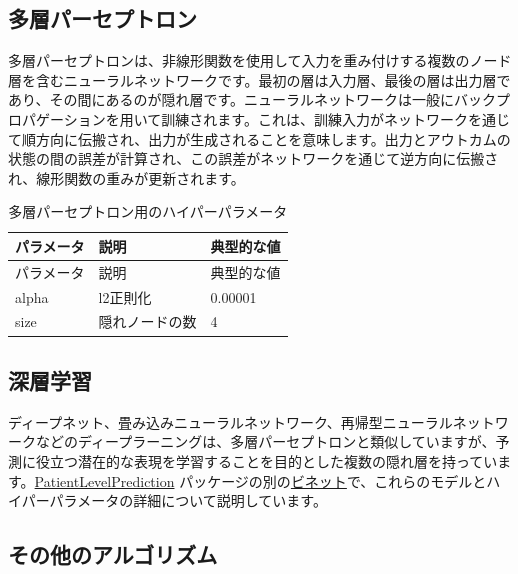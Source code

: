 \documentclass[
  11pt]{book}
\theoremstyle{definition}
\theoremstyle{definition}
\theoremstyle{definition}
\theoremstyle{definition}
\theoremstyle{remark}
\begin{document}
\subsection{多層パーセプトロン}\label{ux591aux5c64ux30d1ux30fcux30bbux30d7ux30c8ux30edux30f3}

多層パーセプトロンは、非線形関数を使用して入力を重み付けする複数のノード層を含むニューラルネットワークです。最初の層は入力層、最後の層は出力層であり、その間にあるのが隠れ層です。ニューラルネットワークは一般にバックプロパゲーションを用いて訓練されます。これは、訓練入力がネットワークを通じて順方向に伝搬され、出力が生成されることを意味します。出力とアウトカムの状態の間の誤差が計算され、この誤差がネットワークを通じて逆方向に伝搬され、線形関数の重みが更新されます。   

\begin{longtable}[]{@{}lll@{}}
\caption{\label{tab:mpParameters} 多層パーセプトロン用のハイパーパラメータ}\tabularnewline
\toprule\noalign{}
パラメータ & 説明 & 典型的な値 \\
\midrule\noalign{}
\endfirsthead
\toprule\noalign{}
パラメータ & 説明 & 典型的な値 \\
\midrule\noalign{}
\endhead
\bottomrule\noalign{}
\endlastfoot
alpha & l2正則化 & 0.00001 \\
size & 隠れノードの数 & 4 \\
\end{longtable}

\subsection{深層学習}\label{ux6df1ux5c64ux5b66ux7fd2}

ディープネット、畳み込みニューラルネットワーク、再帰型ニューラルネットワークなどのディープラーニングは、多層パーセプトロンと類似していますが、予測に役立つ潜在的な表現を学習することを目的とした複数の隠れ層を持っています。\href{https://ohdsi.github.io/PatientLevelPrediction/}{PatientLevelPrediction} パッケージの別の\href{https://ohdsi.github.io/PatientLevelPrediction/articles/BuildingDeepLearningModels.html}{ビネット}で、これらのモデルとハイパーパラメータの詳細について説明しています。   

\subsection{その他のアルゴリズム}\label{ux305dux306eux4ed6ux306eux30a2ux30ebux30b4ux30eaux30baux30e0}
\end{document}
